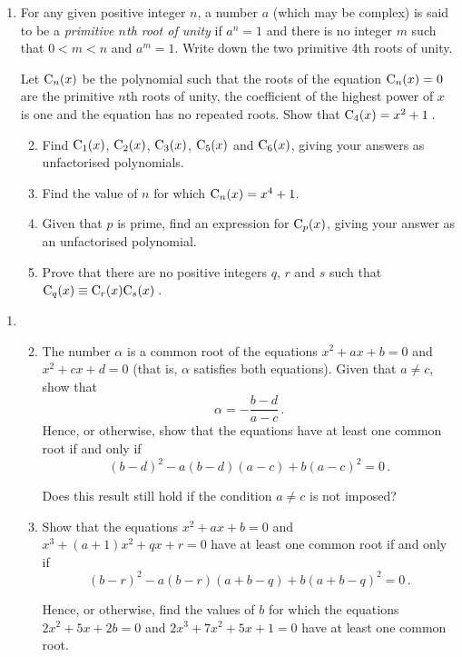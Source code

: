 \documentclass[a4, 11pt]{report}
\newlength{\qspace}
\newcounter{qnumber}
\newenvironment{question}%
 {\vspace{\qspace}
  \begin{enumerate}[\bfseries 1\quad][10]%
    \setcounter{enumi}{\value{qnumber}}%
    \item%
 }
{
  \end{enumerate}
  \filbreak
  \stepcounter{qnumber}
 }
\newenvironment{questionparts}[1][1]%
 {
  \begin{enumerate}[\bfseries (i)]%
    \setcounter{enumii}{#1}
    \addtocounter{enumii}{-1}
    \setlength{\itemsep}{5mm}
    \setlength{\parskip}{8pt}
 }
 {
  \end{enumerate}
 }
\begin{document}
\begin{question}
For any given positive integer $n$,
a number $a$ (which may be complex) is said to be 
a {\sl primitive $n$th root of unity} if $a^n=1$
and there is no integer $m$ such that $0 < m < n$ and $a^m = 1$.
Write down the two primitive 4th roots of unity.


Let ${\rm C}_n(x)$ be the  polynomial such that
 the roots of the equation ${\rm C}_n(x)=0$ are the primitive
$n$th roots of unity,
the coefficient of the highest power of $x$ is one and the equation
has no repeated roots.
Show that ${\rm C}_4(x) = x^2+1\,$.

\begin{questionparts}
\item Find ${\rm C}_1(x)$, ${\rm C}_2(x)$, ${\rm C}_3(x)$, 
${\rm C}_5(x)$ and   ${\rm C}_6(x)$, giving your answers as
unfactorised polynomials.
\item Find the value of $n$ for which ${\rm C}_n(x) = x^4 + 1$.
\item Given that $p$ is prime, find an
expression for ${\rm C}_p(x)$, giving your answer as an unfactorised
polynomial.
\item Prove that there are no positive integers $q$, $r$ and $s$ such
that ${\rm C}_q(x) \equiv {\rm C}_r(x) {\rm C}_s(x)\,$.

\end{questionparts}
\end{question}

\begin{question}
\begin{questionparts}
\item
The number $\alpha$ is a common root of the 
equations $x^2 +ax +b=0$ and  $x^2+cx+d=0$
(that is, $\alpha$ satisfies both equations). Given that $a\ne c$, show that
\[
\alpha =- \frac{b-d}{a-c}\,.
\]
Hence, or otherwise, show that the equations have at least one
common root if and only if
\[
(b-d)^2 -a(b-d)(a-c) + b(a-c)^2 =0\,.
\]

Does this result still hold if the condition $a\ne c$ is not imposed?

\item Show that  the equations 
$x^2+ax+b=0$ and  $x^3+(a+1)x^2+qx+r=0$
have at least one common root if and only if
\[
(b-r)^2-a(b-r)(a+b-q) +b(a+b-q)^2=0\,.
\]

Hence, or otherwise, find the values of $b$ for which the equations
$2x^2+5 x+2 b=0$ and $2x^3+7x^2+5x+1=0$
have at least one common root.


\end{questionparts}
\end{question}
\end{document}
